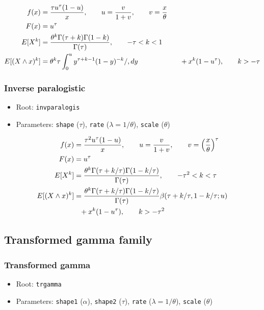 \documentclass[x11names]{article}
\newcommand{\E}[1]{E[ #1 ]}
\newcommand{\code}[1]{\texttt{#1}}
\begin{document}
\begin{align*}
  f(x)
  &= \frac{\tau u^\tau (1 - u)}{x},
    \qquad u = \frac{v}{1 + v},
    \qquad v = \frac{x}{\theta} \\
  F(x)
  &= u^\tau \\
  \E{X^k}
  &= \frac{%
    \theta^k \Gamma(\tau+k) \Gamma(1-k)}{%
    \Gamma(\tau)},
    \qquad -\tau < k < 1 \\
  \E{(X \wedge x)^k}
  &= \theta^k \tau \int_0^u y^{\tau+k-1} (1 - y)^{-k}/, dy
  &\phantom{=} + x^k (1-u^\tau),
    \qquad k > -\tau
\end{align*}

\subsubsection*{Inverse paralogistic}

\begin{itemize}
\item Root: \code{invparalogis}
\item Parameters: \code{shape} ($\tau$),
      \code{rate}   ($\lambda = 1/\theta$),
      \code{scale}  ($\theta$)
\end{itemize}

\begin{align*}
  f(x)
  &= \frac{\tau^2 u^\tau (1 - u)}{x},
    \qquad u = \frac{v}{1 + v},
    \qquad v = \left(\frac{x}{\theta} \right)^\tau \\
  F(x)
  &= u^\tau \\
  \E{X^k}
  &= \frac{%
    \theta^k \Gamma(\tau+k/\tau) \Gamma(1-k/\tau)}{%
    \Gamma(\tau)},
    \qquad -\tau^2 < k < \tau \\
  \E{(X \wedge x)^k}
  &= \frac{%
    \theta^k \Gamma(\tau+k/\tau) \Gamma(1-k/\tau)}{%
    \Gamma(\tau)}
    \beta(\tau+k/\tau, 1-k/\tau; u) \\
  &\phantom{=} + x^k (1-u^\tau),
    \qquad k > -\tau^2
\end{align*}

\subsection{Transformed gamma family}
\label{sec:appendix:transformed-gamma}

\subsubsection*{Transformed gamma}

\begin{itemize}
\item Root: \code{trgamma}
\item Parameters: \code{shape1} ($\alpha$),
      \code{shape2} ($\tau$),
      \code{rate}   ($\lambda = 1/\theta$),
      \code{scale}  ($\theta$)
\end{itemize}
\end{document}
